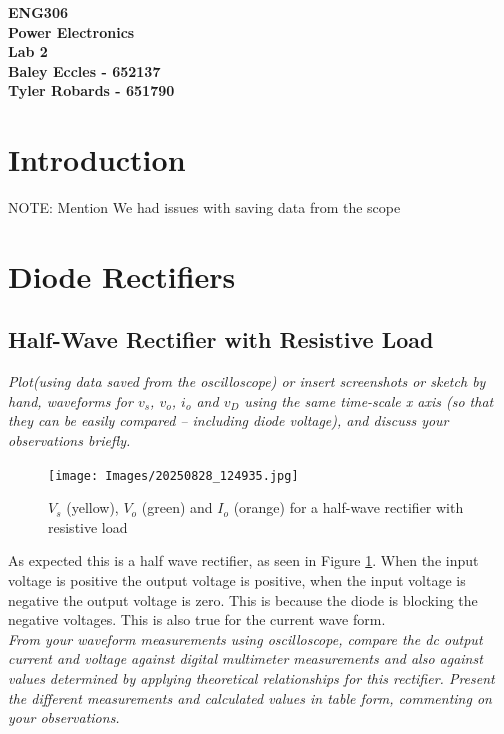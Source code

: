 \documentclass[12pt,a4paper]{article}
\begin{document}
\begin{center}
\textbf{\LARGE ENG306\\[6pt]
Power Electronics}\\[10pt]
\textbf{\large Lab 2\\[4pt]
Baley Eccles - 652137\\
Tyler Robards - 651790}\\
\end{center}

\tableofcontents
\newpage
\section{Introduction}
NOTE: Mention We had issues with saving data from the scope
\section{Diode Rectifiers}
\subsection{Half-Wave Rectifier with Resistive Load}
\textit{Plot(using data saved from the oscilloscope) or insert screenshots or sketch by hand, 
waveforms for $v_s$, $v_o$, $i_o$ and $v_D$ using the same time-scale x axis (so that they can be
easily compared – including diode voltage), and discuss your observations briefly.}\\

\begin{figure}[H]
\centering
\texttt{[image: Images/20250828\_124935.jpg]}
\caption{\(V_s\) (yellow), \(V_o\) (green) and \(I_o\) (orange) for a half-wave rectifier with resistive load \label{fig:figure1}}
\end{figure}

As expected this is a half wave rectifier, as seen in Figure \ref{fig:figure1}. When the input voltage is positive the output voltage is positive, when the input voltage is negative the output voltage is zero. This is because the diode is blocking the negative voltages. This is also true for the current wave form.\\

\textit{From your waveform measurements using oscilloscope, compare the dc output current 
and voltage against digital multimeter measurements and also against values determined by applying 
theoretical relationships for this rectifier. Present the different measurements and calculated 
values in table form, commenting on your observations.}\\
\end{document}
